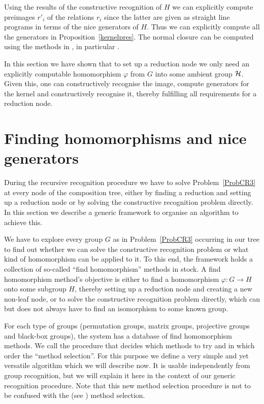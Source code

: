 \begin{Rem}
Using the results of the constructive recognition of $H$ we
can explicitly compute preimages $r'_i$ of the relations $r_i$ since
the latter are given as straight line programs in terms of the nice
%
generators of $H$. Thus we can explicitly compute all the generators in
Proposition~\ref{kernelpres}. The normal closure can be computed using
the methods in \cite[Chapter 2]{Ser}, in particular
\cite[Theorem~2.3.9]{Ser}.
\end{Rem}

In this section we have shown that to set up a reduction node we only need
an explicitly computable homomorphism $\varphi$ from $G$ into some
ambient group $\mathcal{H}$. Given this, one can constructively recognise the
image, compute generators for the kernel and constructively recognise it,
thereby fulfilling all requirements for a reduction node.


\section{Finding homomorphisms and nice generators}
\label{findhom}
%

During the recursive recognition procedure we have to solve
Problem~\ref{ProbCR3} at every node of the composition tree, either
by finding a reduction and setting up a reduction node or by solving 
the constructive recognition problem directly. In this section we describe
a generic framework to organise an algorithm to achieve this.

We have to explore every group $G$ as in Problem~\ref{ProbCR3} 
occurring in our tree to find out whether we 
can solve the constructive recognition 
problem or what kind of homomorphism can be 
applied to it. To this end, the framework holds a collection
of so-called ``find homomorphism'' methods in stock. A find homomorphism
method's objective is either to find a homomorphism $\varphi: G \to H$
onto some subgroup $H$, thereby setting up a reduction node and 
creating a new non-leaf node, or to
solve the constructive recognition 
problem directly, which can but does not always have to find
an isomorphism to some known group.

For each type of groups (permutation groups, matrix groups, projective
groups and black-box
groups), the system has a database of find homomorphism methods.
We call the procedure that decides which methods to try and in which order 
the ``method selection''. For this purpose we define a very simple and yet 
versatile algorithm which we will describe now. It is usable independently
from group recognition, but we will explain it here in the context of
our generic recognition procedure. Note that this new method selection
procedure is not to be confused with the {\GAP} (see \cite{GAP4}) method
selection. 
%

